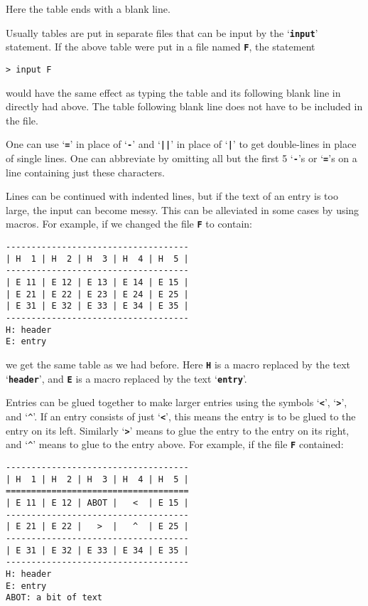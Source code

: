 \documentclass[12pt]{article}
\newcommand{\TT}[1]{{\tt \bfseries #1}}
\newenvironment{indpar}[1][0.3in]%
	{\begin{list}{}%
		     {\setlength{\itemsep}{0in}%
		      \setlength{\topsep}{0in}%
		      \setlength{\parsep}{1ex}%
		      \setlength{\labelwidth}{#1}%
		      \setlength{\leftmargin}{#1}%
		      \addtolength{\leftmargin}{\labelsep}}%
	 \item}%
	{\end{list}}
\begin{document}
Here the table ends with a blank line.

Usually tables are put in separate files that can be
input by the `\TT{input}' statement.  If the above table
were put in a file named \TT{F}, the statement
\begin{indpar}\begin{verbatim}
> input F
\end{verbatim}\end{indpar}
would have the same effect as typing the table and its following
blank line in directly had above.  The table following blank line does not
have to be included in the file.

One can use `\TT{=}' in place of `\TT{-}' and `\TT{||}' in
place of `\TT{|}' to get double-lines in place of single lines.
One can abbreviate by omitting all but the first 5 `\TT{-}'s or
`\TT{=}'s on a line containing just these characters.

Lines can be continued with indented lines, but if the text of
an entry is too large, the input can become messy.  This can be
alleviated in some cases by using macros.  For example, if we
changed the file \TT{F} to contain:
\begin{indpar}\begin{verbatim}
------------------------------------
| H  1 | H  2 | H  3 | H  4 | H  5 |
------------------------------------
| E 11 | E 12 | E 13 | E 14 | E 15 |
| E 21 | E 22 | E 23 | E 24 | E 25 |
| E 31 | E 32 | E 33 | E 34 | E 35 |
------------------------------------
H: header
E: entry
\end{verbatim}\end{indpar}

we get the same table as we had before.
Here \TT{H} is a macro replaced
by the text `\TT{header}', and \TT{E} is a macro replaced by the
text `\TT{entry}'.

Entries can be glued together to make larger entries using the
symbols `\TT{<}', `\TT{>}', and `\verb|^|'.  If an entry consists
of just `\TT{<}', this means the entry is to be glued to the
entry on its left.  Similarly `\TT{>}' means to glue the entry to the entry
on its right, and `\verb|^|' means to glue to the entry above.  For
example, if the file \TT{F} contained:
\begin{indpar}\begin{verbatim}
------------------------------------
| H  1 | H  2 | H  3 | H  4 | H  5 |
====================================
| E 11 | E 12 | ABOT |   <  | E 15 |
------------------------------------
| E 21 | E 22 |   >  |   ^  | E 25 |
------------------------------------
| E 31 | E 32 | E 33 | E 34 | E 35 |
------------------------------------
H: header
E: entry
ABOT: a bit of text
\end{verbatim}\end{indpar}
\end{document}
